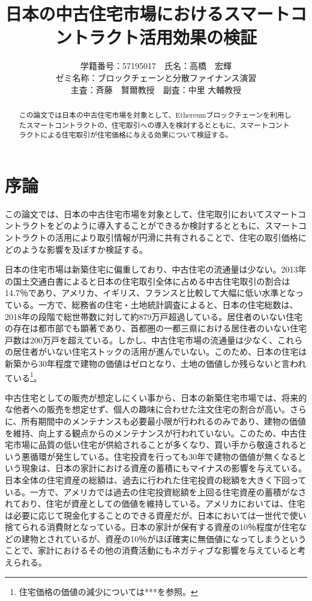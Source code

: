 \documentclass[a4paper,11pt]{jlreq}
\title{日本の中古住宅市場におけるスマートコントラクト活用効果の検証}
\author{
学籍番号：57195017　氏名：高橋　宏輝
\\ゼミ名称：ブロックチェーンと分散ファイナンス演習
\\主査：斉藤　賢爾教授　副査：中里 大輔教授}
\begin{document}
\date{}
\maketitle
\begin{abstract}
この論文では日本の中古住宅市場を対象として、Ethereumブロックチェーンを利用したスマートコントラクトの、住宅取引への導入を検討するとともに、スマートコントラクトによる住宅取引が住宅価格に与える効果について検証する。
\end{abstract}

\newpage
\tableofcontents

\newpage
\section{序論}
この論文では、日本の中古住宅市場を対象として、住宅取引においてスマートコントラクトをどのように導入することができるか検討するとともに、スマートコントラクトの活用により取引情報が円滑に共有されることで、住宅の取引価格にどのような影響を及ぼすか検証する。

日本の住宅市場は新築住宅に偏重しており、中古住宅の流通量は少ない。2013年の国土交通白書によると日本の住宅取引全体に占める中古住宅取引の割合は14.7％であり、アメリカ、イギリス、フランスと比較して大幅に低い水準となっている。一方で、総務省の住宅・土地統計調査によると、日本の住宅総数は、2018年の段階で総世帯数に対して約879万戸超過している。居住者のいない住宅の存在は都市部でも顕著であり、首都圏の一都三県における居住者のいない住宅戸数は200万戸を超えている。しかし、中古住宅市場の流通量は少なく、これらの居住者がいない住宅ストックの活用が進んでいない。このため、日本の住宅は新築から30年程度で建物の価値はゼロとなり、土地の価値しか残らないと言われている\footnote{住宅価格の価値の減少については***を参照。}。

中古住宅としての販売が想定しにくい事から、日本の新築住宅市場では、将来的な他者への販売を想定せず、個人の趣味に合わせた注文住宅の割合が高い。さらに、所有期間中のメンテナンスも必要最小限が行われるのみであり、建物の価値を維持、向上する観点からのメンテナンスが行われていない。このため、中古住宅市場に品質の低い住宅が供給されることが多くなり、買い手から敬遠されるという悪循環が発生している。住宅投資を行っても30年で建物の価値が無くなるという現象は、日本の家計における資産の蓄積にもマイナスの影響を与えている。
日本全体の住宅資産の総額は、過去に行われた住宅投資の総額を大きく下回っている。一方で、アメリカでは過去の住宅投資総額を上回る住宅資産の蓄積がなされており、住宅が資産としての価値を維持している。アメリカにおいては、住宅は必要に応じて現金化することのできる資産だが、日本においては一世代で使い捨てられる消費財となっている。日本の家計が保有する資産の10％程度が住宅などの建物とされているが、資産の10％がほぼ確実に無価値になってしまうということで、家計におけるその他の消費活動にもネガティブな影響を与えていると考えられる。
\end{document}
